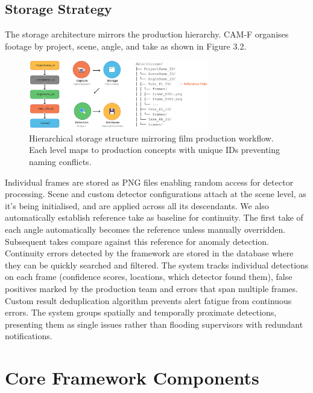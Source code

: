 \subsection{Storage Strategy}
The storage architecture mirrors the production hierarchy. CAM-F organises footage by project, scene, angle, and take as shown in Figure 3.2.

\begin{figure}[h]
\centering
\includegraphics[width=0.7\textwidth]{figures/storage.png}
\caption{Hierarchical storage structure mirroring film production workflow. Each level maps to production concepts with unique IDs preventing naming conflicts.}
\label{fig:storage}
\end{figure}

Individual frames are stored as PNG files enabling random access for detector processing. Scene and custom detector configurations attach at the scene level, as it's being initialised, and are applied across all its descendants. We also automatically establish reference take as baseline for continuity. The first take of each angle automatically becomes the reference unless manually overridden. Subsequent takes compare against this reference for anomaly detection.
Continuity errors detected by the framework are stored in the database where they can be quickly searched and filtered. The system tracks individual detections on each frame (confidence scores, locations, which detector found them), false positives marked by the production team and errors that span multiple frames. Custom result deduplication algorithm prevents alert fatigue from continuous errors. The system groups spatially and temporally proximate detections, presenting them as single issues rather than flooding supervisors with redundant notifications.
\section{Core Framework Components}
